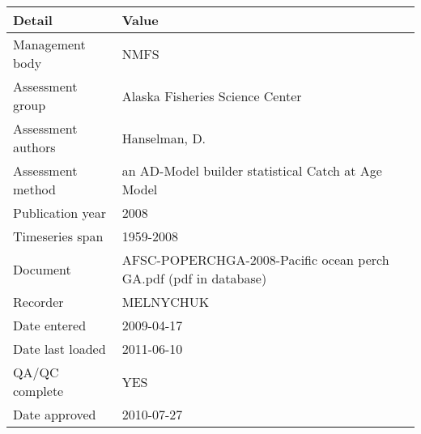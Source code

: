 \begin{table}[htb]
\centering
\begin{tabular}{lp{7cm}}
\toprule
Detail & Value \\
\midrule
Management body    & NMFS                                                             \\
Assessment group   & Alaska Fisheries Science Center                                  \\
Assessment authors & Hanselman, D.                                                    \\
Assessment method  & an AD-Model builder statistical Catch at Age Model               \\
Publication year   & 2008                                                             \\
Timeseries span    & 1959-2008                                                        \\
Document           & AFSC-POPERCHGA-2008-Pacific ocean perch GA.pdf (pdf in database) \\
Recorder           & MELNYCHUK                                                        \\
Date entered       & 2009-04-17                                                       \\
Date last loaded   & 2011-06-10                                                       \\
QA/QC complete     & YES                                                              \\
Date approved      & 2010-07-27                                                       \\
\bottomrule
\end{tabular}
\label{tab:assessdet}
\end{table}
